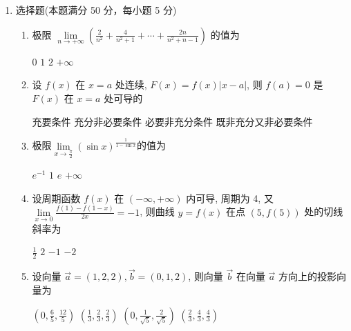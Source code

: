 
\begin{enumerate}
	\item
	选择题(本题满分 50 分，每小题 5 分)
	\begin{enumerate}
		\item
		极限 $\lim\limits _{n \rightarrow+\infty}\left(\frac{2}{n^{2}}+\frac{4}{n^{2}+1}+\cdots+\frac{2 n}{n^{2}+n-1}\right)$ 的值为  
		
		
\fourchoices
{$ 0 $}
{$ 1 $}
{$ 2 $}
{$+\infty$}

\item 
设 $f(x)$ 在 $x=a$ 处连续, $F(x)=f(x)|x-a|$, 则 $f(a)=0$ 是 $F(x)$ 在 $x=a$ 处可导的  


\fourchoices
{充要条件}
{充分非必要条件}
{必要非充分条件}
{既非充分又非必要条件}

		
\item 
极限$\lim\limits _{x \rightarrow \frac{\pi}{2}}(\sin x)^{\frac{1}{1-\sin x}}$的值为 



\fourchoices
{$e^{-1}$}
{$ 1 $}
{$e$}
{$+\infty$}

\item 
设周期函数 $f(x)$ 在 $(-\infty,+\infty)$ 内可导, 周期为 4, 又 $\lim\limits _{x \rightarrow 0} \frac{f(1)-f(1-x)}{2 x}=-1$, 则曲线 $y=f(x)$ 在点 $(5, f(5))$ 处的切线斜率为  


\fourchoices
{$\frac{1}{2}$}
{$ 2 $}
{$-1$}
{$-2$}

\item 
设向量 $\vec{a}=(1,2,2),  \vec{b}=(0,1,2)$, 则向量 $\vec{b}$ 在向量 $\vec{a}$ 方向上的投影向量为  


\fourchoices
{$\left(0, \frac{6}{5}, \frac{12}{5}\right)$}
{$\left(\frac{1}{3}, \frac{2}{3}, \frac{2}{3}\right)$}
{$\left(0, \frac{1}{\sqrt{5}}, \frac{2}{\sqrt{5}}\right)$}
{$\left(\frac{2}{3}, \frac{4}{3}, \frac{4}{3}\right)$}


\end{enumerate}
\end{enumerate}
